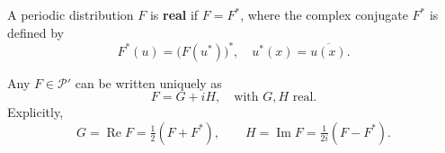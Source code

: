 A periodic distribution $F$ is \textbf{real} if $F = F^*$, where the complex conjugate $F^*$ is defined by
$$F^*(u) = \bigl(F(u^*)\bigr)^*, \quad u^*(x) = \overline{u(x)}.$$

Any $F \in \mathcal{P}'$ can be written uniquely as
$$F = G + iH, \quad \text{with } G, H \text{ real}.$$
Explicitly,
$$G = \operatorname{Re} F = \tfrac{1}{2}(F + F^*), \qquad H = \operatorname{Im} F = \tfrac{1}{2i}(F - F^*).$$
